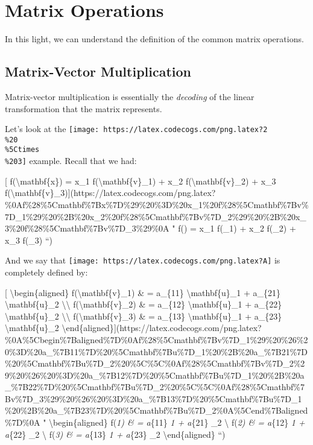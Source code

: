 \documentclass[]{article}
\begin{document}
\hypertarget{matrix-operations}{%
\section{Matrix Operations}\label{matrix-operations}}

In this light, we can understand the definition of the common matrix operations.

\hypertarget{matrix-vector-multiplication}{%
\subsection{Matrix-Vector Multiplication}\label{matrix-vector-multiplication}}

Matrix-vector multiplication is essentially the \emph{decoding} of the linear
transformation that the matrix represents.

Let's look at the
\texttt{[image: https://latex.codecogs.com/png.latex?2\\\%20\\\%5Ctimes\\\%203]}
example. Recall that we had:

{[} f(\textbackslash{}mathbf\{x\}) = x\_1 f(\textbackslash{}mathbf\{v\}\_1) +
x\_2 f(\textbackslash{}mathbf\{v\}\_2) + x\_3
f(\textbackslash{}mathbf\{v\}\_3){]}(https://latex.codecogs.com/png.latex?\%0Af\%28\%5Cmathbf\%7Bx\%7D\%29\%20\%3D\%20x\_1\%20f\%28\%5Cmathbf\%7Bv\%7D\_1\%29\%20\%2B\%20x\_2\%20f\%28\%5Cmathbf\%7Bv\%7D\_2\%29\%20\%2B\%20x\_3\%20f\%28\%5Cmathbf\%7Bv\%7D\_3\%29\%0A
" f() = x\_1 f(\_1) + x\_2 f(\_2) + x\_3
f(\_3) ``)

And we say that \texttt{[image: https://latex.codecogs.com/png.latex?A]} is
completely defined by:

{[} \textbackslash{}begin\{aligned\} f(\textbackslash{}mathbf\{v\}\_1) \& =
a\_\{11\} \textbackslash{}mathbf\{u\}\_1 + a\_\{21\}
\textbackslash{}mathbf\{u\}\_2 \textbackslash{}\textbackslash{}
f(\textbackslash{}mathbf\{v\}\_2) \& = a\_\{12\} \textbackslash{}mathbf\{u\}\_1
+ a\_\{22\} \textbackslash{}mathbf\{u\}\_2 \textbackslash{}\textbackslash{}
f(\textbackslash{}mathbf\{v\}\_3) \& = a\_\{13\} \textbackslash{}mathbf\{u\}\_1
+ a\_\{23\} \textbackslash{}mathbf\{u\}\_2
\textbackslash{}end\{aligned\}{]}(https://latex.codecogs.com/png.latex?\%0A\%5Cbegin\%7Baligned\%7D\%0Af\%28\%5Cmathbf\%7Bv\%7D\_1\%29\%20\%26\%20\%3D\%20a\_\%7B11\%7D\%20\%5Cmathbf\%7Bu\%7D\_1\%20\%2B\%20a\_\%7B21\%7D\%20\%5Cmathbf\%7Bu\%7D\_2\%20\%5C\%5C\%0Af\%28\%5Cmathbf\%7Bv\%7D\_2\%29\%20\%26\%20\%3D\%20a\_\%7B12\%7D\%20\%5Cmathbf\%7Bu\%7D\_1\%20\%2B\%20a\_\%7B22\%7D\%20\%5Cmathbf\%7Bu\%7D\_2\%20\%5C\%5C\%0Af\%28\%5Cmathbf\%7Bv\%7D\_3\%29\%20\%26\%20\%3D\%20a\_\%7B13\%7D\%20\%5Cmathbf\%7Bu\%7D\_1\%20\%2B\%20a\_\%7B23\%7D\%20\%5Cmathbf\%7Bu\%7D\_2\%0A\%5Cend\%7Baligned\%7D\%0A
" \textbackslash{}begin\{aligned\} f(\emph{1) \& = a}\{11\}
\emph{1 + a}\{21\} \_2 \textbackslash{} f(\emph{2)
\& = a}\{12\} \emph{1 + a}\{22\} \_2 \textbackslash{}
f(\emph{3) \& = a}\{13\} \emph{1 + a}\{23\} \_2
\textbackslash{}end\{aligned\} ``)
\end{document}
